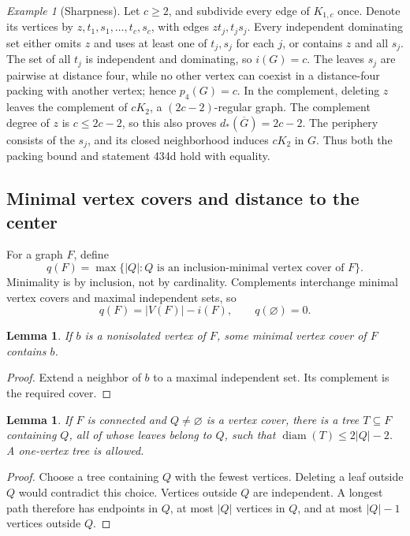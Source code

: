 \documentclass[11pt,a4paper]{article}
\newtheorem{lemma}[theorem]{Lemma}
\theoremstyle{definition}\newtheorem{definition}[theorem]{Definition}
\theoremstyle{remark}\newtheorem{remark}[theorem]{Remark}
\newtheorem{example}[theorem]{Example}
\newcommand{\diam}{\operatorname{diam}}
\begin{document}
\begin{example}[Sharpness]
\label{early:ex:434d-sharp}
Let $c\geq2$, and subdivide every edge of $K_{1,c}$ once.  Denote its
vertices by $z,t_1,s_1,\ldots,t_c,s_c$, with edges $zt_j,t_js_j$.
Every independent dominating set either omits $z$ and uses at least one
of $t_j,s_j$ for each $j$, or contains $z$ and all $s_j$.  The set of all
$t_j$ is independent and dominating, so $i(G)=c$.  The leaves $s_j$ are
pairwise at distance four, while no other vertex can coexist in a
distance-four packing with another vertex; hence $p_4(G)=c$.
In the complement, deleting $z$ leaves the complement of $cK_2$, a
$(2c-2)$-regular graph.  The complement degree of $z$ is $c\leq2c-2$,
so this also proves $d_*(\overline G)=2c-2$.  The periphery consists of
the $s_j$, and its closed neighborhood induces $cK_2$ in $G$.  Thus both
the packing bound and statement 434d hold with equality.
\end{example}

\subsection{Minimal vertex covers and distance to the center}

For a graph $F$, define
\[
 q(F)=\max\{|Q|:Q\text{ is an inclusion-minimal vertex cover of }F\}.
\]
Minimality is by inclusion, not by cardinality.  Complements interchange
minimal vertex covers and maximal independent sets, so
\begin{equation}
 q(F)=|V(F)|-i(F),\qquad q(\varnothing)=0.
 \label{early:eq:upper-cover}
\end{equation}

\begin{lemma}
\label{early:lem:boundary-cover}
If $b$ is a nonisolated vertex of $F$, some minimal vertex cover of $F$
contains $b$.
\end{lemma}
\begin{proof}
Extend a neighbor of $b$ to a maximal independent set.  Its complement
is the required cover.
\end{proof}

\begin{lemma}
\label{early:lem:cover-tree}
If $F$ is connected and $Q\ne\varnothing$ is a vertex cover, there is a
tree $T\subseteq F$ containing $Q$, all of whose leaves belong to $Q$,
such that $\diam(T)\leq2|Q|-2$.  A one-vertex tree is allowed.
\end{lemma}
\begin{proof}
Choose a tree containing $Q$ with the fewest vertices.  Deleting a leaf
outside $Q$ would contradict this choice.  Vertices outside $Q$ are
independent.  A longest path therefore has endpoints in $Q$, at most
$|Q|$ vertices in $Q$, and at most $|Q|-1$ vertices outside $Q$.
\end{proof}
\end{document}
